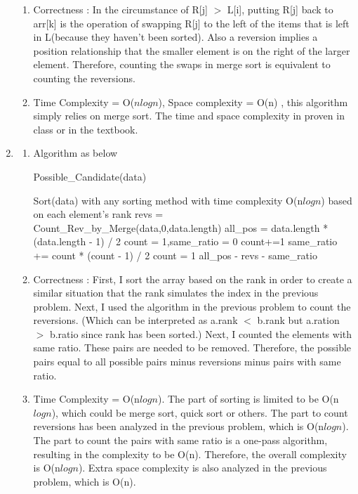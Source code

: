 \documentclass{article}
\begin{document}
\begin{CJK*}{UTF8}{bsmi}
\begin{enumerate}
\begin{enumerate}
        \item Correctness : In the circumstance of R[j] $>$ L[i], putting R[j] back to arr[k] is the operation of swapping R[j] to the left of the items that is left in L(because they haven't been sorted). Also a reversion implies a position relationship that the smaller element is on the right of the larger element.
        Therefore, counting the swaps in merge sort is equivalent to counting the reversions.
        \item Time Complexity = O(${n log{n}}$), Space complexity = O(n) , this algorithm simply relies on merge sort. The time and space complexity in proven in class or in the textbook.
    \end{enumerate}
        
    \item  \begin{enumerate}
        \item Algorithm as below
        \begin{algorithm}[H]
        \caption{Possible\_Candidate(data)}
        \begin{algorithmic}
        \State Sort(data) with any sorting method with time complexity O(n$log{n}$) based on each element's rank
        \State revs = Count\_Rev\_by\_Merge(data,0,data.length) 
        \State all\_pos = data.length * (data.length - 1) / 2
        \State count = 1,same\_ratio = 0
                \State count+=1
            \Else
                \State same\_ratio += count * (count - 1) / 2
                \State count = 1
            \EndIf
        \EndFor
        \State \Return all\_pos - revs - same\_ratio
        \end{algorithmic}
        \end{algorithm}

        \item Correctness : First, I sort the array based on the rank in order to create a similar situation that the rank simulates the index in the previous problem. Next, I used the algorithm in the previous problem to count the reversions. (Which can be interpreted as a.rank $<$ b.rank but a.ration $>$ b.ratio since rank has been sorted.) Next, I counted the elements with same ratio. These pairs are needed to be removed. Therefore, the possible pairs equal to all possible pairs minus reversions minus pairs with same ratio.
        \item Time Complexity = O(n$log{n}$). The part of sorting is limited to be O(n$log{n}$), which could be merge sort, quick sort or others. The part to count reversions has been analyzed in the previous problem, which is O(n$log{n}$). The part to count the pairs with same ratio is a one-pass algorithm, resulting in the complexity to be O(n). Therefore, the overall complexity is O(n$log{n}$). Extra space complexity is also analyzed in the previous problem, which is O(n). 
    \end{enumerate}


\end{enumerate}
\end{CJK*}
\end{document}

